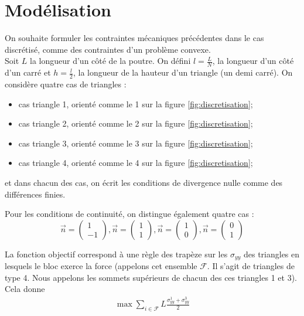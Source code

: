 \newpage
\section{Modélisation}
On souhaite formuler les contraintes mécaniques précédentes dans le cas discrétisé, comme des contraintes d'un problème convexe.\\

Soit $L$ la longueur d'un côté de la poutre. On défini $l=\frac{L}{N}$, la longueur d'un côté d'un carré et $h=\frac{l}{2}$, la longueur de la hauteur d'un triangle (un demi carré). On considère quatre cas de triangles : 
\begin{itemize}
\item cas triangle 1, orienté comme le 1 sur la figure \ref{fig:discretisation};
\item cas triangle 2, orienté comme le 2 sur la figure \ref{fig:discretisation};
\item cas triangle 3, orienté comme le 3 sur la figure \ref{fig:discretisation};
\item cas triangle 4, orienté comme le 4 sur la figure \ref{fig:discretisation};
\end{itemize} 
et dans chacun des cas, on écrit les conditions de divergence nulle comme des différences finies. 

Pour les conditions de continuité, on distingue également quatre cas : 
\begin{equation}
\overrightarrow{n} = \begin{pmatrix}
1\\
-1
\end{pmatrix}, 
\overrightarrow{n} = \begin{pmatrix}
1\\
1
\end{pmatrix}, 
\overrightarrow{n} = \begin{pmatrix}
1\\
0
\end{pmatrix},
\overrightarrow{n} = \begin{pmatrix}
0\\
1
\end{pmatrix}
\end{equation}

La fonction objectif correspond à une règle des trapèze sur les $\sigma_{yy}$ des triangles en lesquels le bloc exerce la force (appelons cet ensemble $\mathcal{F}$. Il s'agit de triangles de type 4. Nous appelons les sommets supérieurs de chacun des ces triangles 1 et 3). Cela donne
\begin{align*}
\max \sum_{i \in \mathcal{F}} L \frac{\sigma_{yy}^1 + \sigma_{yy}^3}{2}
\end{align*}

